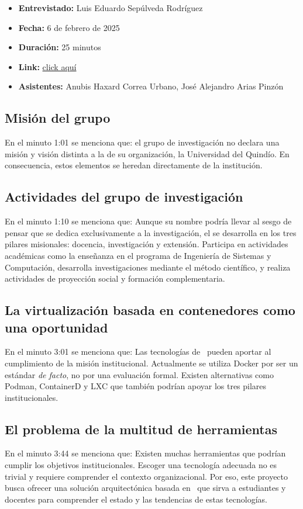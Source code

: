 \begin{itemize}
  \item \textbf{Entrevistado:} Luis Eduardo Sepúlveda Rodríguez
  \item \textbf{Fecha:} 6 de febrero de 2025
  \item \textbf{Duración:} 25 minutos
  \item \textbf{Link:} \href{https://drive.google.com/file/d/1rIc9xOsyDqumlTV-QXcw0inPyIbSEHLz/view?usp=sharing}{click aquí}
  \item \textbf{Asistentes:} Anubis Haxard Correa Urbano, José Alejandro Arias Pinzón
\end{itemize}

\subsection{Misión del grupo \GRID}
\noindent
En el minuto 1:01 se menciona que: el grupo de investigación no declara una misión y visión distinta a la de su organización, la Universidad del Quindío. En consecuencia, estos elementos se heredan directamente de la institución.

\subsection{Actividades del grupo de investigación}
\noindent
En el minuto 1:10 se menciona que: Aunque su nombre podría llevar al sesgo de pensar que se dedica exclusivamente a la investigación, el \GRID se desarrolla en los tres pilares misionales: docencia, investigación y extensión. Participa en actividades académicas como la enseñanza en el programa de Ingeniería de Sistemas y Computación, desarrolla investigaciones mediante el método científico, y realiza actividades de proyección social y formación complementaria.

\subsection{La virtualización basada en contenedores como una oportunidad}
\noindent
En el minuto 3:01 se menciona que: Las tecnologías de \VBC\ pueden aportar al cumplimiento de la misión institucional. Actualmente se utiliza Docker por ser un estándar \textit{de facto}, no por una evaluación formal. Existen alternativas como Podman, ContainerD y LXC que también podrían apoyar los tres pilares institucionales.

\subsection{El problema de la multitud de herramientas}
\noindent
En el minuto 3:44 se menciona que: Existen muchas herramientas que podrían cumplir los objetivos institucionales. Escoger una tecnología adecuada no es trivial y requiere comprender el contexto organizacional. Por eso, este proyecto busca ofrecer una solución arquitectónica basada en \VBC\, que sirva a estudiantes y docentes para comprender el estado y las tendencias de estas tecnologías.

